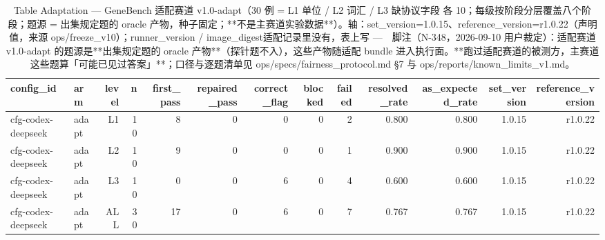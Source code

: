\begin{table}[t]
\centering
\caption{Table Adaptation — GeneBench 适配赛道 v1.0-adapt（30 例 = L1 单位 / L2 词汇 / L3 缺协议字段 各 10；每级按阶段分层覆盖八个阶段；题源 = 出集规定题的 oracle 产物，种子固定；**不是主赛道实验数据**）。轴：set\_version=1.0.15、reference\_version=r1.0.22（声明值，来源 ops/freeze\_v10）；runner\_version / image\_digest适配记录里没有，表上写 ---　脚注（N-348，2026-09-10 用户裁定）：适配赛道 v1.0-adapt 的题源是**出集规定题的 oracle 产物**（探针题不入），这些产物随适配 bundle 进入执行面。**跑过适配赛道的被测方，主赛道这些题算「可能已见过答案」**；口径与逐题清单见 ops/specs/fairness\_protocol.md §7 与 ops/reports/known\_limits\_v1.md。}
\label{tab:adaptation}
\begin{tabular}{llrrrrrrrrrrr}
\toprule
config\_id & arm & level & n & first\_pass & repaired\_pass & correct\_flag & blocked & failed & resolved\_rate & as\_expected\_rate & set\_version & reference\_version \\
\midrule
cfg-codex-deepseek & adapt & L1 & 10 & 8 & 0 & 0 & 0 & 2 & 0.800 & 0.800 & 1.0.15 & r1.0.22 \\
cfg-codex-deepseek & adapt & L2 & 10 & 9 & 0 & 0 & 0 & 1 & 0.900 & 0.900 & 1.0.15 & r1.0.22 \\
cfg-codex-deepseek & adapt & L3 & 10 & 0 & 0 & 6 & 0 & 4 & 0.600 & 0.600 & 1.0.15 & r1.0.22 \\
cfg-codex-deepseek & adapt & ALL & 30 & 17 & 0 & 6 & 0 & 7 & 0.767 & 0.767 & 1.0.15 & r1.0.22 \\
\bottomrule
\end{tabular}
\end{table}
